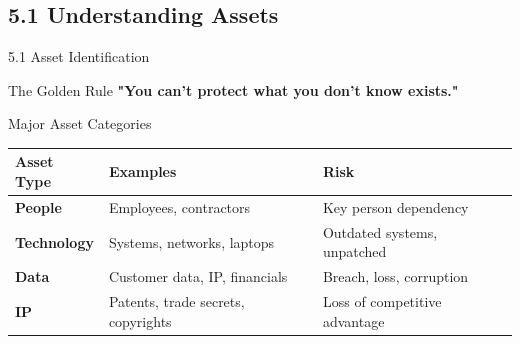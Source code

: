 \documentclass[10pt]{beamer}  %
\begin{document}
	\subsection{5.1 Understanding Assets}
	\begin{frame}{5.1 Asset Identification}
		\begin{block}{The Golden Rule}
			\centering
			\Large{\textbf{"You can't protect what you don't know exists."}}
		\end{block}
		
		\begin{block}{Major Asset Categories}
			\begin{tabular}{|p{2.5cm}|p{4cm}|p{4.5cm}|}
				\hline
				\textbf{Asset Type} & \textbf{Examples} & \textbf{Risk} \\
				\hline
				\textbf{People} & Employees, contractors & Key person dependency \\
				\hline
				\textbf{Technology} & Systems, networks, laptops & Outdated systems, unpatched \\
				\hline
				\textbf{Data} & Customer data, IP, financials & Breach, loss, corruption \\
				\hline
				\textbf{IP} & Patents, trade secrets, copyrights & Loss of competitive advantage \\
				\hline
			\end{tabular}
		\end{block}
	\end{frame}
	
\end{document}
